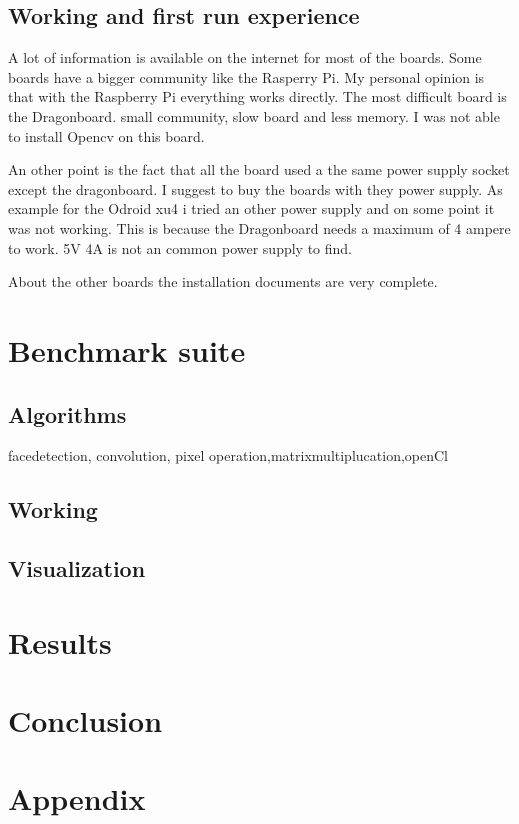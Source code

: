 \documentclass[english]{book_template} %
\begin{document}
\section{Working and first run experience}

A lot of information is available on the internet for most of the boards. Some boards have a bigger community like the Rasperry Pi.
My personal opinion is that with the Raspberry Pi everything works directly. The most difficult board is the Dragonboard. small community, slow board and less memory. I was not able to install Opencv on this board.

An other point is the fact that all the board used a the same power supply socket except the dragonboard. I suggest to buy the boards with they power supply. As example for the Odroid xu4 i tried an other power supply and on some point it was not working. This is because the Dragonboard needs a maximum of 4 ampere to work. 5V 4A is not an common power supply to find.

About the other boards the installation documents are very complete. 

 
\chapter{Benchmark suite}

\section{Algorithms}
facedetection,  convolution, pixel operation,matrixmultiplucation,openCl
\section{Working}

\section{Visualization}

\chapter{Results}   


\chapter{Conclusion}

 
\printbibliography
\thispagestyle{plain}
\newpage
{}
\chapter{Appendix}
\appendix



\end{document}
